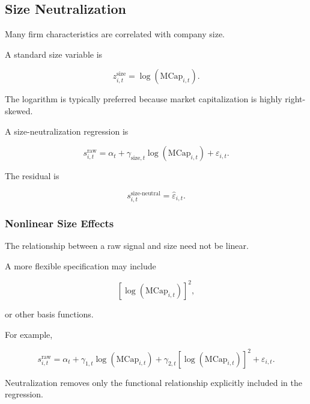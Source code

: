 \documentclass[11pt,a4paper]{article}
\begin{document}
\subsection{Size Neutralization}
\label{subsec:size_neutralization}

Many firm characteristics are correlated with company size.

A standard size variable is

\begin{equation}
\boxed{
z_{i,t}^{\mathrm{size}}
=
\log
\left(
\mathrm{MCap}_{i,t}
\right).
}
\end{equation}

The logarithm is typically preferred because market capitalization is highly
right-skewed.

A size-neutralization regression is

\begin{equation}
s_{i,t}^{\mathrm{raw}}
=
\alpha_t
+
\gamma_{\mathrm{size},t}
\log
\left(
\mathrm{MCap}_{i,t}
\right)
+
\varepsilon_{i,t}.
\end{equation}

The residual is

\begin{equation}
\boxed{
s_{i,t}^{\mathrm{size\text{-}neutral}}
=
\widehat{\varepsilon}_{i,t}.
}
\end{equation}


\subsubsection{Nonlinear Size Effects}

The relationship between a raw signal and size need not be linear.

A more flexible specification may include

\begin{equation}
\left[
\log(\mathrm{MCap}_{i,t})
\right]^2,
\end{equation}

or other basis functions.

For example,

\begin{equation}
s_{i,t}^{\mathrm{raw}}
=
\alpha_t
+
\gamma_{1,t}
\log(\mathrm{MCap}_{i,t})
+
\gamma_{2,t}
\left[
\log(\mathrm{MCap}_{i,t})
\right]^2
+
\varepsilon_{i,t}.
\end{equation}

Neutralization removes only the functional relationship explicitly included in
the regression.
\end{document}
